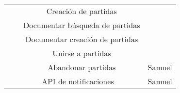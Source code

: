 \documentclass[11pt, a4paper, titlepage]{article}
\begin{document}
\begin{landscape}
\begin{table}[hbt!]
\begin{tabular}{c|cc|c|}
\multicolumn{1}{|c|}{}                             & \multicolumn{1}{c|}{}                                                                                                          & Creación de partidas                                                                                                                                                                             &                                     \\ \cline{3-3}
\multicolumn{1}{|c|}{}                             & \multicolumn{1}{c|}{}                                                                                                          & Documentar búsqueda de partidas                                                                                                                                                                  &                                     \\ \cline{3-3}
\multicolumn{1}{|c|}{}                             & \multicolumn{1}{c|}{}                                                                                                          & Documentar creación de partidas                                                                                                                                                                  &                                     \\ \cline{3-3}
\multicolumn{1}{|c|}{}                             & \multicolumn{1}{c|}{}                                                                                                          & Unirse a partidas                                                                                                                                                                                &                                     \\ \cline{3-4} 
\multicolumn{1}{|c|}{}                             & \multicolumn{1}{c|}{}                                                                                                          & Abandonar partidas                                                                                                                                                                               & Samuel                              \\ \cline{2-4} 
\multicolumn{1}{|c|}{}                             & \multicolumn{2}{c|}{API de notificaciones}                                                                                                                                                                                                                                                                                        & Samuel                              \\ \cline{2-4} 

\end{tabular}
\end{table}
\end{landscape}
\end{document}
